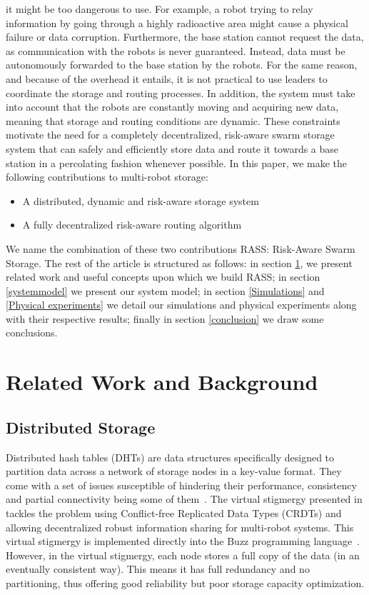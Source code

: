 \documentclass[runningheads]{llncs}
\begin{document}
it might be too dangerous to use. For example, a robot trying to relay
information by going through a highly radioactive area might cause a
physical failure or data corruption. Furthermore, the base station
cannot request the data, as communication with the robots is
never guaranteed. Instead, data must be autonomously forwarded to the base station
by the robots. For the same reason, and because of the overhead it
entails, it is not practical to use leaders to coordinate the storage
and routing processes. In addition, the system must take into account 
that the robots are constantly moving and acquiring new data,
meaning that storage and routing conditions are dynamic. These
constraints motivate the need for a completely decentralized,
risk-aware swarm storage system that can safely and efficiently store
data and route it towards a base station in a percolating fashion
whenever possible. In this paper, we make the following contributions
to multi-robot storage:

\begin{itemize}
    \item A distributed, dynamic and risk-aware storage system
    \item A fully decentralized risk-aware routing algorithm
\end{itemize}

We name the combination of these two contributions RASS: Risk-Aware Swarm Storage.
The rest of the article is structured as follows: in section \ref{relatedwork}, we
present related work and useful concepts upon which we build RASS; in section \ref{systemmodel} we present our system model; in section \ref{Simulations} and \ref{Physical experiments} we
detail our simulations and physical experiments along with their respective results; finally in section \ref{conclusion} we
draw some conclusions.

\section{Related Work and Background}
\label{relatedwork}

\subsection{Distributed Storage}

Distributed hash tables (DHTs) are data structures specifically
designed to partition data across a network of storage nodes in a
key-value format. They come with a set of issues susceptible of
hindering their performance, consistency and partial connectivity
being some of them~\cite{amigoni2017multirobot}. The virtual stigmergy
presented in \cite{pinciroliTuple2016} tackles the problem using
Conflict-free Replicated Data Types (CRDTs) and allowing decentralized
robust information sharing for multi-robot systems. This virtual
stigmergy is implemented directly into the Buzz programming
language~\cite{pinciroliBuzz2016}. However, in the virtual stigmergy,
each node stores a full copy of the data (in an eventually consistent
way). This means it has full redundancy and no partitioning, thus
offering good reliability but poor storage capacity optimization.
\end{document}
